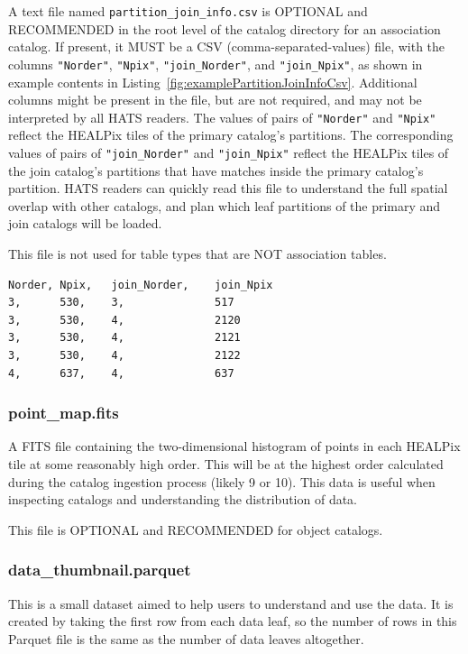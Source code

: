 \documentclass[11pt,a4paper]{ivoa}
\begin{document}
A text file named \texttt{partition\_join\_info.csv} is OPTIONAL and RECOMMENDED in the root level of the catalog directory for an association catalog.
If present, it MUST be a CSV (comma-separated-values) file, with the columns \texttt{"Norder"}, \texttt{"Npix"}, \texttt{"join\_Norder"}, and \texttt{"join\_Npix"}, as shown in example contents in Listing~\ref{fig:examplePartitionJoinInfoCsv}.
Additional columns might be present in the file, but are not required, and may not be interpreted by all HATS readers.
The values of pairs of \texttt{"Norder"} and \texttt{"Npix"} reflect the HEALPix tiles of the primary catalog's partitions. 
The corresponding values of pairs of \texttt{"join\_Norder"} and \texttt{"join\_Npix"} reflect the HEALPix tiles of the join catalog's partitions that have matches inside the primary catalog's partition.
HATS readers can quickly read this file to understand the full spatial overlap with other catalogs, and plan which leaf partitions of the primary and join catalogs will be loaded. \par

This file is not used for table types that are NOT association tables.

\begin{minipage}{\linewidth}
\begin{lstlisting}[caption=Example \texttt{partition\_join\_info.csv} file contents, label=fig:examplePartitionJoinInfoCsv]    
Norder,	Npix,   join_Norder,    join_Npix
3,      530,    3,              517
3,      530,    4,              2120
3,      530,    4,              2121
3,      530,    4,              2122
4,      637,    4,              637
\end{lstlisting}
\end{minipage}

\subsubsection{point\_map.fits} 

A FITS file containing the two-dimensional histogram of points in each HEALPix tile at some reasonably high order.
This will be at the highest order calculated during the catalog ingestion process (likely 9 or 10). 
This data is useful when inspecting catalogs and understanding the distribution of data. 

This file is OPTIONAL and RECOMMENDED for object catalogs.

\subsubsection{data\_thumbnail.parquet} 
This is a small dataset aimed to help users to understand and use the data. 
It is created by taking the first row from each data leaf, so the number of rows in this Parquet file is the same as the number of data leaves altogether. \par
\end{document}
